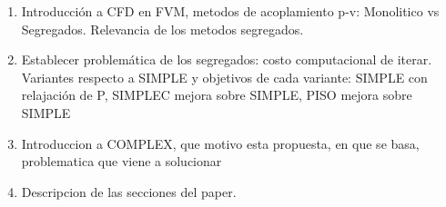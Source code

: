 \documentclass[final,3p,times,11pt,onecolumn]{myElsarticle}
\numberwithin{equation}{section}
\begin{document}
\begin{enumerate}
    \item {\color{red} Introducción a CFD en FVM, metodos de acoplamiento p-v: Monolitico vs Segregados. Relevancia de los metodos segregados.} 
    \item {\color{red} Establecer problemática de los segregados: costo computacional de iterar. Variantes respecto a SIMPLE y objetivos de cada variante: SIMPLE con relajación de P, SIMPLEC mejora sobre SIMPLE, PISO mejora sobre SIMPLE}
    \item {\color{red} Introduccion a COMPLEX, que motivo esta propuesta, en que se basa, problematica que viene a solucionar}
    \item {\color{red} Descripcion de las secciones del paper.}
\end{enumerate}
\end{document}
